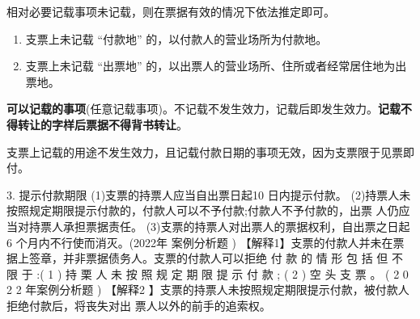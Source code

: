 \documentclass[UTF8,12pt]{ctexart}
\numberwithin{equation}{section} %
\numberwithin{figure}{section}
\numberwithin{table}{section}
\begin{document}
	相对必要记载事项未记载，则在票据有效的情况下依法推定即可。
	\begin{enumerate}
		\item 支票上未记载 “付款地” 的，以付款人的营业场所为付款地。
		
		\item 支票上未记载 “出票地” 的，以出票人的营业场所、住所或者经常居住地为出票地。
	\end{enumerate}

	
	\textbf{可以记载的事项}(任意记载事项)。不记载不发生效力，记载后即发生效力。\textbf{记载不得转让的字样后票据不得背书转让}。
	
	支票上记载的用途不发生效力，且记载付款日期的事项无效，因为支票限于见票即付。
	
	
	3. 提示付款期限
	(1)支票的持票人应当自出票日起10 日内提示付款。
	(2)持票人未按照规定期限提示付款的，付款人可以不予付款;付款人不予付款的，出票 人仍应当对持票人承担票据责任。
	(3)支票的持票人对出票人的票据权利，自出票之日起6 个月内不行使而消灭。(2022年 案例分析题 )
	【解释1】支票的付款人并未在票据上签章，并非票据债务人。支票的付款人可以拒绝 付 款 的 情 形 包 括 但 不 限 于 :( 1 ) 持 栗 人 未 按 照 规 定 期 限 提 示 付 款 ; ( 2 ) 空 头 支 票 。 ( 2 0 2 2 年案例分析题 )
	【解释2 】支票的持票人未按照规定期限提示付款，被付款人拒绝付款后，将丧失对出 票人以外的前手的追索权。
	
	
	
	
\end{document}
